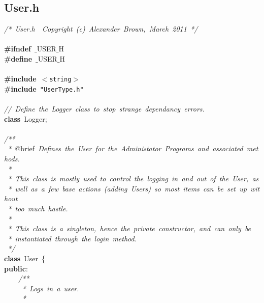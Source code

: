 \subsection{User.h}
\scriptsize
\sffamily
\noindent
\mbox{}\textit{/*\ User.h\ \ Copyright\ (c)\ Alexander\ Brown,\ March\ 2011\ */} \\
\mbox{} \\
\mbox{}\textbf{\#ifndef}\ $\_$USER$\_$H \\
\mbox{}\textbf{\#define}\ $\_$USER$\_$H \\
\mbox{} \\
\mbox{}\textbf{\#include}\ \texttt{$<$string$>$} \\
\mbox{}\textbf{\#include}\ \texttt{"{}UserType.h"{}} \\
\mbox{} \\
\mbox{}\textit{//\ Define\ the\ Logger\ class\ to\ stop\ strange\ dependancy\ errors.} \\
\mbox{}\textbf{class}\ Logger; \\
\mbox{} \\
\mbox{}\textit{/**} \\
\mbox{}\textit{\ *\ }@brief\textit{\ Defines\ the\ User\ for\ the\ Administator\ Programs\ and\ associated\ methods.} \\
\mbox{}\textit{\ *} \\
\mbox{}\textit{\ *\ This\ class\ is\ mostly\ used\ to\ control\ the\ logging\ in\ and\ out\ of\ the\ User,\ as} \\
\mbox{}\textit{\ *\ well\ as\ a\ few\ base\ actions\ (adding\ Users)\ so\ most\ items\ can\ be\ set\ up\ without} \\
\mbox{}\textit{\ *\ too\ much\ hastle.} \\
\mbox{}\textit{\ *} \\
\mbox{}\textit{\ *\ This\ class\ is\ a\ singleton,\ hence\ the\ private\ constructor,\ and\ can\ only\ be} \\
\mbox{}\textit{\ *\ instantiated\ through\ the\ login\ method.} \\
\mbox{}\textit{\ */} \\
\mbox{}\textbf{class}\ User\ \{ \\
\mbox{}\textbf{public}: \\
\mbox{}\ \ \ \ \textit{/**} \\
\mbox{}\textit{\ \ \ \ \ *\ Logs\ in\ a\ user.} \\
\mbox{}\textit{\ \ \ \ \ *} \\
